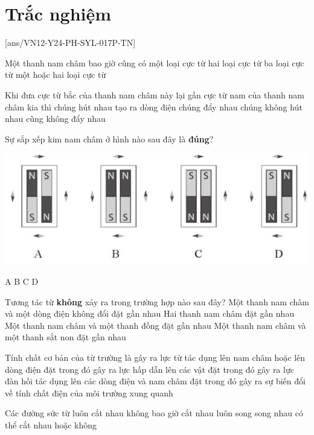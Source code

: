 \let\lesson\undefined
\newcommand{\lesson}{\phantomlesson{Bài 9.}}


\setcounter{section}{2}
\section{Trắc nghiệm}
\setcounter{ex}{0}
[ans/VN12-Y24-PH-SYL-017P-TN]
\begin{ex}
	Một thanh nam châm bao giờ cũng có
	\choice
	{một loại cực từ}
	{\True hai loại cực từ}
	{ba loại cực từ}
	{một hoặc hai loại cực từ}
	\loigiai{}
\end{ex}
\begin{ex}
	Khi đưa cực từ bắc của thanh nam châm này lại gần cực từ nam của thanh nam châm kia thì
	\choice
	{\True chúng hút nhau}
	{tạo ra dòng điện}
	{chúng đẩy nhau}
	{chúng không hút nhau cũng không đẩy nhau}
	\loigiai{}
\end{ex}
\begin{ex}
Sự sắp xếp kim nam châm ở hình nào sau đây là \textbf{đúng}?	
\begin{center}
	\includegraphics[width=0.7\linewidth]{../figs/VN12-Y24-PH-SYL-017P-7}
\end{center}
	\choice
	{\True A}
	{B}
	{C}
	{D}
	\loigiai{}
\end{ex}

\begin{ex}
	Tương tác từ \textbf{không} xảy ra trong trường hợp nào sau đây?
	\choice
	{Một thanh nam châm và một dòng điện không đổi đặt gần nhau}
	{Hai thanh nam châm đặt gần nhau}
	{\True Một thanh nam châm và một thanh đồng đặt gần nhau}
	{Một thanh nam châm và một thanh sắt non đặt gần nhau}
	\loigiai{}
\end{ex}
\begin{ex}
	Tính chất cơ bản của từ trường là
	\choice
	{\True gây ra lực từ tác dụng lên nam châm hoặc lên dòng điện đặt trong đó}
	{gây ra lực hấp dẫn lên các vật đặt trong đó}
	{gây ra lực đàn hồi tác dụng lên các dòng điện và nam châm đặt trong đó}
	{gây ra sự biến đổi về tính chất điện của môi trường xung quanh}
	\loigiai{}
\end{ex}
\begin{ex}
Các đường sức từ	
	\choice
	{luôn cắt nhau}
	{\True không bao giờ cắt nhau}
	{luôn song song nhau}
	{có thể cắt nhau hoặc không}
	\loigiai{}
\end{ex}

